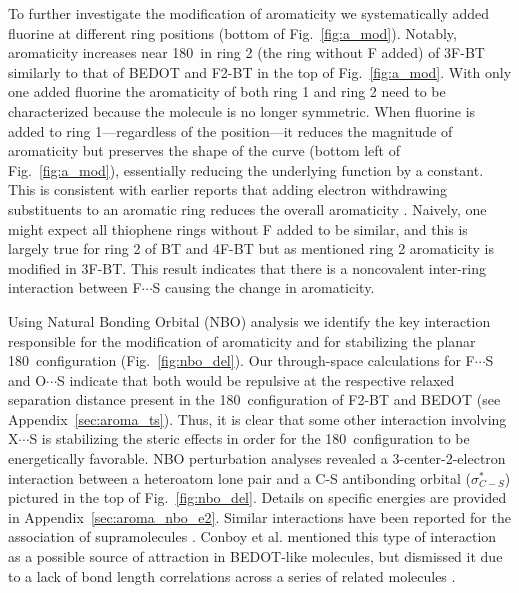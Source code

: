 To further investigate the modification of aromaticity we systematically added fluorine at different ring positions (bottom of Fig.~\ref{fig:a_mod}). Notably, aromaticity increases near 180\textdegree \ in ring 2 (the ring without F added) of 3F-BT similarly to that of BEDOT and F2-BT in the top of Fig.~\ref{fig:a_mod}. With only one added fluorine the aromaticity of both ring 1 and ring 2 need to be characterized because the molecule is no longer symmetric. When fluorine is added to ring 1---regardless of the position---it reduces the magnitude of aromaticity but preserves the shape of the curve (bottom left of Fig.~\ref{fig:a_mod}), essentially reducing the underlying function by a constant. This is consistent with earlier reports that adding electron withdrawing substituents to an aromatic ring reduces the overall aromaticity \cite{Krygowski2014}. Naively, one might expect all thiophene rings without F added to be similar, and this is largely true for ring 2 of BT and 4F-BT but as mentioned ring 2 aromaticity is modified in 3F-BT. This result indicates that there is a noncovalent inter-ring interaction between F$\cdots$S causing the change in aromaticity.

Using Natural Bonding Orbital (NBO) analysis we identify the key interaction responsible for the modification of aromaticity and for stabilizing the planar 180\textdegree \ configuration (Fig.~\ref{fig:nbo_del}). Our through-space calculations for F$\cdots$S and O$\cdots$S indicate that both would be repulsive at the respective relaxed separation distance present in the 180\textdegree \ configuration of F2-BT and BEDOT (see Appendix~\ref{sec:aroma_ts}). Thus, it is clear that some other interaction involving X$\cdots$S is stabilizing the steric effects in order for the 180\textdegree \ configuration to be energetically favorable. NBO perturbation analyses revealed a 3-center-2-electron interaction between a heteroatom lone pair and a C-S antibonding orbital ($\sigma^{*}_{C-S}$) pictured in the top of Fig.~\ref{fig:nbo_del}. Details on specific energies are provided in Appendix~\ref{sec:aroma_nbo_e2}. Similar interactions have been reported for the association of supramolecules \cite{Cozzolino2005}. Conboy et al. mentioned this type of interaction as a possible source of attraction in BEDOT-like molecules, but dismissed it due to a lack of bond length correlations across a series of related molecules \cite{Conboy2016}.

